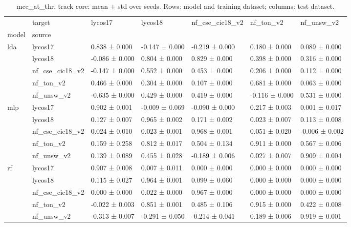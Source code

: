 \begin{table}
\caption{mcc_at_thr, track core: mean $\pm$ std over seeds. Rows: model and training dataset; columns: test dataset.}
\label{tab:matrix_core_mcc_at_thr}
\begin{tabular}{lllllll}
\toprule
 & target & lycos17 & lycos18 & nf_cse_cic18_v2 & nf_ton_v2 & nf_unsw_v2 \\
model & source &  &  &  &  &  \\
\midrule
\multirow[t]{5}{*}{lda} & lycos17 & 0.838 ± 0.000 & -0.147 ± 0.000 & -0.219 ± 0.000 & 0.180 ± 0.000 & 0.089 ± 0.000 \\
 & lycos18 & -0.086 ± 0.000 & 0.804 ± 0.000 & 0.829 ± 0.000 & 0.398 ± 0.000 & 0.316 ± 0.000 \\
 & nf_cse_cic18_v2 & -0.147 ± 0.000 & 0.552 ± 0.000 & 0.453 ± 0.000 & 0.206 ± 0.000 & 0.112 ± 0.000 \\
 & nf_ton_v2 & 0.466 ± 0.000 & 0.304 ± 0.000 & 0.107 ± 0.000 & 0.681 ± 0.000 & 0.063 ± 0.000 \\
 & nf_unsw_v2 & -0.635 ± 0.000 & 0.429 ± 0.000 & 0.419 ± 0.000 & -0.116 ± 0.000 & 0.531 ± 0.000 \\
\cline{1-7}
\multirow[t]{5}{*}{mlp} & lycos17 & 0.902 ± 0.001 & -0.009 ± 0.069 & -0.090 ± 0.000 & 0.217 ± 0.003 & 0.001 ± 0.017 \\
 & lycos18 & 0.127 ± 0.007 & 0.965 ± 0.002 & 0.171 ± 0.002 & 0.023 ± 0.007 & 0.113 ± 0.008 \\
 & nf_cse_cic18_v2 & 0.024 ± 0.010 & 0.023 ± 0.001 & 0.968 ± 0.001 & 0.051 ± 0.020 & -0.006 ± 0.002 \\
 & nf_ton_v2 & 0.159 ± 0.258 & 0.812 ± 0.017 & 0.504 ± 0.134 & 0.911 ± 0.000 & 0.567 ± 0.006 \\
 & nf_unsw_v2 & 0.139 ± 0.089 & 0.455 ± 0.028 & -0.189 ± 0.006 & 0.027 ± 0.007 & 0.909 ± 0.004 \\
\cline{1-7}
\multirow[t]{5}{*}{rf} & lycos17 & 0.907 ± 0.008 & 0.007 ± 0.011 & 0.000 ± 0.000 & 0.000 ± 0.000 & 0.000 ± 0.000 \\
 & lycos18 & 0.115 ± 0.027 & 0.964 ± 0.001 & 0.099 ± 0.060 & 0.000 ± 0.000 & 0.000 ± 0.000 \\
 & nf_cse_cic18_v2 & 0.000 ± 0.000 & 0.022 ± 0.000 & 0.967 ± 0.000 & 0.000 ± 0.000 & 0.000 ± 0.000 \\
 & nf_ton_v2 & -0.022 ± 0.003 & 0.851 ± 0.001 & 0.485 ± 0.106 & 0.915 ± 0.000 & 0.422 ± 0.008 \\
 & nf_unsw_v2 & -0.313 ± 0.007 & -0.291 ± 0.050 & -0.214 ± 0.041 & 0.189 ± 0.006 & 0.919 ± 0.001 \\

\end{tabular}
\end{table}
